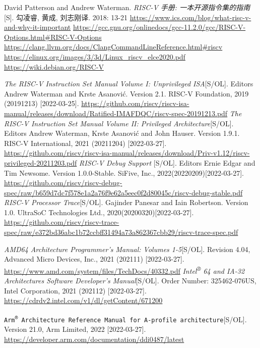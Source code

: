 \documentclass[UTF8,fontset=none,linespread=1.15]{ctexart}
\begin{document}
\begin{thebibliography}{99}
 David Patterson and Andrew Waterman. \textit{RISC-V 手册: 一本开源指令集的指南}[S]. 勾凌睿, 黄成, 刘志刚译. 2018: 13-21
 \url{https://www.ics.com/blog/what-risc-v-and-why-it-important}
 \url{https://gcc.gnu.org/onlinedocs/gcc-11.2.0/gcc/RISC-V-Options.html#RISC-V-Options}
 \url{https://clang.llvm.org/docs/ClangCommandLineReference.html#riscv}
 \url{https://elinux.org/images/3/3d/Linux_riscv_elce2020.pdf}
 \url{https://wiki.debian.org/RISC-V}

 \textit{The RISC-V Instruction Set Manual
Volume I: Unprivileged ISA}[S/OL]. Editors Andrew Waterman and Krste Asanović. Version 2.1. RISC-V Foundation, 2019 (20191213) [2022-03-25]. \url{https://github.com/riscv/riscv-isa-manual/releases/download/Ratified-IMAFDQC/riscv-spec-20191213.pdf}
 \textit{The RISC-V Instruction Set Manual
Volume II: Privileged Architecture}[S/OL]. Editors Andrew Waterman, Krste Asanović and John Hauser.
Version 1.9.1. RISC-V International, 2021 (20211204) [2022-03-27]. \url{https://github.com/riscv/riscv-isa-manual/releases/download/Priv-v1.12/riscv-privileged-20211203.pdf}
 \textit{RISC-V Debug Support
}[S/OL]. Editors Ernie Edgar and Tim Newsome. Version 1.0.0-Stable. SiFive, Inc., 2022(20220209)[2022-03-27]. \url{https://github.com/riscv/riscv-debug-spec/raw/b659d7dc7f578e1a2a76f9e62a5eec0f2d80045c/riscv-debug-stable.pdf}
 \textit{RISC-V Processor Trace}[S/OL]. Gajinder Panesar and
Iain Robertson. Version 1.0. UltraSoC Technologies Ltd., 2020(20200320)[2022-03-27]. \url{https://github.com/riscv/riscv-trace-spec/raw/e372bd36abc1b72ccbff31494a73a862367cbb29/riscv-trace-spec.pdf}

 \textit{AMD64 Architecture Programmer's Manual: Volumes 1-5}[S/OL]. Revision 4.04, Advanced Micro Devices, Inc., 2021 (202111) [2022-03-27]. \url{https://www.amd.com/system/files/TechDocs/40332.pdf}
 \textit{Intel\textsuperscript{®} 64 and IA-32 Architectures Software Developer’s Manual}[S/OL]. Order Number: 325462-076US, Intel Corporation, 2021 (202112) [2022-03-27]. \url{https://cdrdv2.intel.com/v1/dl/getContent/671200}

 \texttt{Arm\textsuperscript{®} Architecture Reference Manual
for A-profile architecture}[S/OL]. Version 21.0, Arm Limited, 2022 [2022-03-27]. \url{https://developer.arm.com/documentation/ddi0487/latest}


\end{thebibliography}
\end{document}

